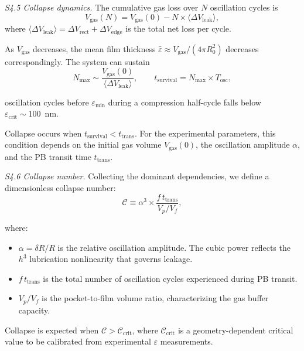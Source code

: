 \documentclass[%
 preprint,
 superscriptaddress,
 amsmath,amssymb,
 aps, prl,
]{revtex4-2}
\begin{document}
{\noindent\textit{S4.5 Collapse dynamics.}}
The cumulative gas loss over $N$ oscillation cycles is
\begin{equation}
V_{\text{gas}}(N) = V_{\text{gas}}(0) - N \times
\langle \Delta V_{\text{leak}} \rangle,
\label{eq:s4_cumulative}
\end{equation}
where $\langle \Delta V_{\text{leak}} \rangle = \Delta V_{\text{rect}} + \Delta V_{\text{edge}}$ is the total net loss per cycle.\par

As $V_{\text{gas}}$ decreases, the mean film thickness $\bar{\varepsilon} \approx V_{\text{gas}}/(4\pi R_0^2)$ decreases correspondingly. The system can sustain
\begin{equation}
N_{\max} \sim \frac{V_{\text{gas}}(0)}{\langle\Delta V_{\text{leak}}\rangle},
\qquad
t_{\text{survival}} = N_{\max} \times T_{\text{osc}},
\label{eq:s4_survival}
\end{equation}

oscillation cycles before $\varepsilon_{\min}$ during a compression half-cycle falls below $\varepsilon_{\text{crit}} \sim 100$~nm.\par

Collapse occurs when $t_{\text{survival}} < t_{\text{trans}}$. For the experimental parameters, this condition depends on the initial gas volume $V_{\text{gas}}(0)$, the oscillation amplitude $\alpha$, and the PB transit time $t_{\text{trans}}$.\par

{\noindent\textit{S4.6 Collapse number.}}
Collecting the dominant dependencies, we define a dimensionless collapse number:
\begin{equation}
\boxed{\mathcal{C} \equiv \alpha^3 \times \frac{f\,t_{\text{trans}}}{V_p/V_f}},
\label{eq:s4_collapse_number}
\end{equation}

where:
\begin{itemize}
\item $\alpha = \delta R/R$ is the relative oscillation amplitude. The cubic power reflects the $h^3$ lubrication nonlinearity that governs leakage.
\item $f\,t_{\text{trans}}$ is the total number of oscillation cycles experienced during PB transit.
\item $V_p/V_f$ is the pocket-to-film volume ratio, characterizing the gas buffer capacity.
\end{itemize}

Collapse is expected when $\mathcal{C} > \mathcal{C}_{\text{crit}}$, where $\mathcal{C}_{\text{crit}}$ is a geometry-dependent critical value to be calibrated from experimental $\varepsilon$ measurements.\par
\end{document}
